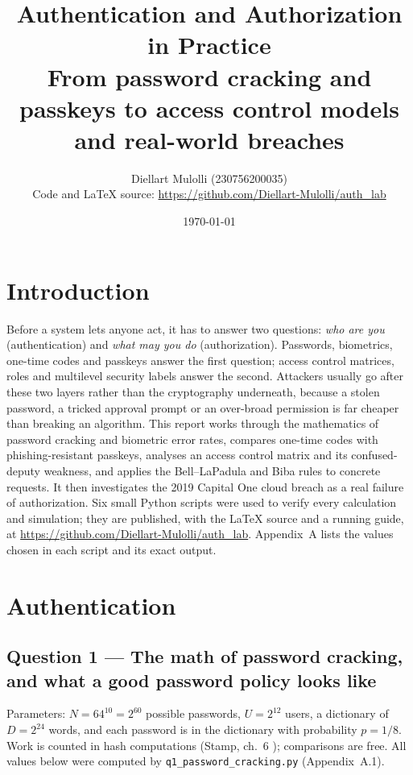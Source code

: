 \documentclass[11pt,a4paper]{article}
\title{\textbf{Authentication and Authorization in Practice}\\[0.3em]
\large From password cracking and passkeys to access control models and real-world breaches}
\author{Diellart Mulolli (230756200035)\\[0.2em] \small Code and LaTeX source: \url{https://github.com/Diellart-Mulolli/auth_lab}}
\date{\today}
\begin{document}
\maketitle

\section*{Introduction}
Before a system lets anyone act, it has to answer two questions: \emph{who are you} (authentication) and
\emph{what may you do} (authorization). Passwords, biometrics, one-time codes and passkeys answer the first
question; access control matrices, roles and multilevel security labels answer the second. Attackers
usually go after these two layers rather than the cryptography underneath, because a stolen password, a
tricked approval prompt or an over-broad permission is far cheaper than breaking an algorithm. This report
works through the mathematics of password cracking and biometric error rates, compares one-time codes with
phishing-resistant passkeys, analyses an access control matrix and its confused-deputy weakness, and applies
the Bell--LaPadula and Biba rules to concrete requests. It then investigates the 2019 Capital One cloud
breach as a real failure of authorization. Six small Python scripts were used to verify every calculation
and simulation; they are published, with the LaTeX source and a running guide, at
\url{https://github.com/Diellart-Mulolli/auth_lab}. Appendix~A lists the values chosen in each script and
its exact output.

\section*{Authentication}

\subsection*{Question 1 --- The math of password cracking, and what a good password policy looks like}
Parameters: $N=64^{10}=2^{60}$ possible passwords, $U=2^{12}$ users, a dictionary of $D=2^{24}$ words, and
each password is in the dictionary with probability $p=1/8$. Work is counted in hash computations
(Stamp, ch.~6 \cite{stamp}); comparisons are free. All values below were computed by \texttt{q1\_password\_cracking.py}
(Appendix~A.1).
\end{document}
